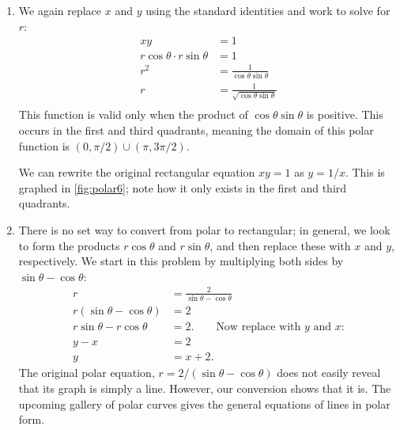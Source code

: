 \begin{example}
\begin{enumerate}
	\item		We again replace $x$ and $y$ using the standard identities and work to solve for $r$:
	\begin{align*}
	xy &= 1 \\
	r\cos\theta\cdot r\sin\theta & = 1\\
	r^2 & = \frac{1}{\cos\theta\sin\theta}\\
	r & = \frac{1}{\sqrt{\cos\theta\sin\theta}}\\
	\end{align*}
%
%
	This function is valid only when the product of $\cos\theta\sin\theta$ is positive. This occurs in the first and third quadrants, meaning the domain of this polar function is $(0,\pi/2) \cup (\pi,3\pi/2)$.
	
	We can rewrite the original rectangular equation $xy=1$ as $y=1/x$. This is graphed in \autoref{fig:polar6}; note how it only exists in the first and third quadrants.
		
	\item		There is no set way to convert from polar to rectangular; in general, we look to form the products $r\cos \theta$ and $r\sin\theta$, and then replace these with $x$ and $y$, respectively. We start in this problem by multiplying both sides by $\sin\theta-\cos\theta$:
	\begin{align*}
	r &= \frac{2}{\sin\theta-\cos\theta} \\
	r(\sin\theta-\cos\theta) &= 2\\
	r\sin\theta-r\cos\theta &= 2. \qquad \text{Now replace with $y$ and $x$:}\\
	y-x &= 2\\
	y &= x+2.
	\end{align*}
	The original polar equation, $r=2/(\sin\theta-\cos\theta)$ does not easily reveal that its graph is simply a line. However, our conversion shows that it is. The upcoming gallery of polar curves gives the general equations of lines in polar form.


\end{enumerate}
\end{example}
